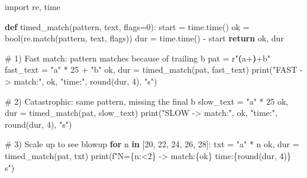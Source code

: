 \documentclass[
  letterpaper,
  DIV=11,
  numbers=noendperiod]{scrreprt}
\newenvironment{Shaded}{\begin{snugshade}}{\end{snugshade}}
\newcommand{\BuiltInTok}[1]{\textcolor[rgb]{0.00,0.23,0.31}{#1}}
\newcommand{\CommentTok}[1]{\textcolor[rgb]{0.37,0.37,0.37}{#1}}
\newcommand{\ControlFlowTok}[1]{\textcolor[rgb]{0.00,0.23,0.31}{\textbf{#1}}}
\newcommand{\DecValTok}[1]{\textcolor[rgb]{0.68,0.00,0.00}{#1}}
\newcommand{\ImportTok}[1]{\textcolor[rgb]{0.00,0.46,0.62}{#1}}
\newcommand{\KeywordTok}[1]{\textcolor[rgb]{0.00,0.23,0.31}{\textbf{#1}}}
\newcommand{\NormalTok}[1]{\textcolor[rgb]{0.00,0.23,0.31}{#1}}
\newcommand{\OperatorTok}[1]{\textcolor[rgb]{0.37,0.37,0.37}{#1}}
\newcommand{\SpecialCharTok}[1]{\textcolor[rgb]{0.37,0.37,0.37}{#1}}
\newcommand{\SpecialStringTok}[1]{\textcolor[rgb]{0.13,0.47,0.30}{#1}}
\newcommand{\StringTok}[1]{\textcolor[rgb]{0.13,0.47,0.30}{#1}}
\newcommand{\VerbatimStringTok}[1]{\textcolor[rgb]{0.13,0.47,0.30}{#1}}
\begin{document}
\begin{Shaded}
\begin{Highlighting}[]
\ImportTok{import}\NormalTok{ re, time}

\KeywordTok{def}\NormalTok{ timed\_match(pattern, text, flags}\OperatorTok{=}\DecValTok{0}\NormalTok{):}
\NormalTok{    start }\OperatorTok{=}\NormalTok{ time.time()}
\NormalTok{    ok }\OperatorTok{=} \BuiltInTok{bool}\NormalTok{(re.match(pattern, text, flags))}
\NormalTok{    dur }\OperatorTok{=}\NormalTok{ time.time() }\OperatorTok{{-}}\NormalTok{ start}
    \ControlFlowTok{return}\NormalTok{ ok, dur}

\CommentTok{\# 1) Fast match: pattern matches because of trailing \textquotesingle{}b\textquotesingle{}}
\NormalTok{pat }\OperatorTok{=} \VerbatimStringTok{r"}\KeywordTok{(}\VerbatimStringTok{a}\OperatorTok{+}\KeywordTok{)}\OperatorTok{+}\VerbatimStringTok{b"}
\NormalTok{fast\_text }\OperatorTok{=} \StringTok{"a"} \OperatorTok{*} \DecValTok{25} \OperatorTok{+} \StringTok{"b"}
\NormalTok{ok, dur }\OperatorTok{=}\NormalTok{ timed\_match(pat, fast\_text)}
\BuiltInTok{print}\NormalTok{(}\StringTok{"FAST   {-}\textgreater{} match:"}\NormalTok{, ok, }\StringTok{"time:"}\NormalTok{, }\BuiltInTok{round}\NormalTok{(dur, }\DecValTok{4}\NormalTok{), }\StringTok{"s"}\NormalTok{)}

\CommentTok{\# 2) Catastrophic: same pattern, missing the final \textquotesingle{}b\textquotesingle{}}
\NormalTok{slow\_text }\OperatorTok{=} \StringTok{"a"} \OperatorTok{*} \DecValTok{25}
\NormalTok{ok, dur }\OperatorTok{=}\NormalTok{ timed\_match(pat, slow\_text)}
\BuiltInTok{print}\NormalTok{(}\StringTok{"SLOW   {-}\textgreater{} match:"}\NormalTok{, ok, }\StringTok{"time:"}\NormalTok{, }\BuiltInTok{round}\NormalTok{(dur, }\DecValTok{4}\NormalTok{), }\StringTok{"s"}\NormalTok{)}

\CommentTok{\# 3) Scale up to see blowup}
\ControlFlowTok{for}\NormalTok{ n }\KeywordTok{in}\NormalTok{ [}\DecValTok{20}\NormalTok{, }\DecValTok{22}\NormalTok{, }\DecValTok{24}\NormalTok{, }\DecValTok{26}\NormalTok{, }\DecValTok{28}\NormalTok{]:}
\NormalTok{    txt }\OperatorTok{=} \StringTok{"a"} \OperatorTok{*}\NormalTok{ n}
\NormalTok{    ok, dur }\OperatorTok{=}\NormalTok{ timed\_match(pat, txt)}
    \BuiltInTok{print}\NormalTok{(}\SpecialStringTok{f"N=}\SpecialCharTok{\{}\NormalTok{n}\SpecialCharTok{:\textless{}2\}}\SpecialStringTok{ {-}\textgreater{} match:}\SpecialCharTok{\{}\NormalTok{ok}\SpecialCharTok{\}}\SpecialStringTok{ time:}\SpecialCharTok{\{}\BuiltInTok{round}\NormalTok{(dur, }\DecValTok{4}\NormalTok{)}\SpecialCharTok{\}}\SpecialStringTok{ s"}\NormalTok{)}


\end{Highlighting}
\end{Shaded}
\end{document}
